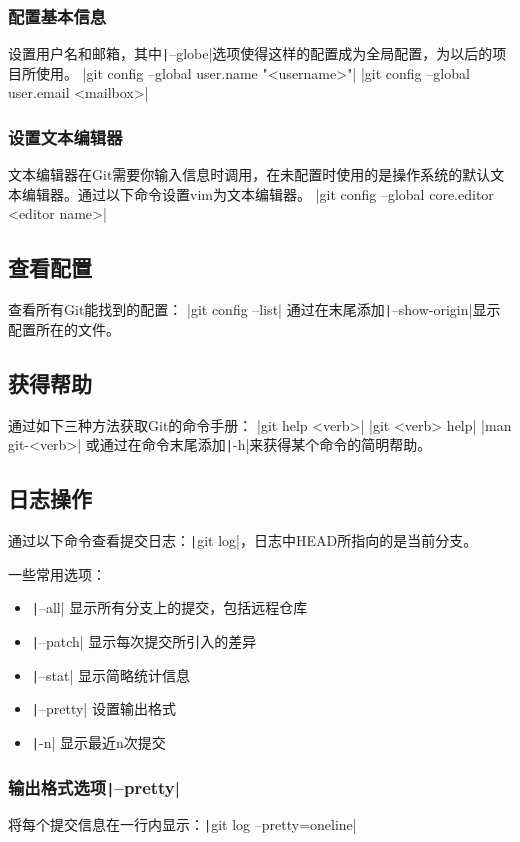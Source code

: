 \documentclass[fontset=ubuntu]{ctexart}
\begin{document}
\subsubsection{配置基本信息}
设置用户名和邮箱，其中\texttt|--globe|选项使得这样的配置成为全局配置，为以后的项目所使用。
|git config --global user.name "<username>"|
|git config --global user.email <mailbox>|

\subsubsection{设置文本编辑器}
文本编辑器在Git需要你输入信息时调用，在未配置时使用的是操作系统的默认文本编辑器。通过以下命令设置vim为文本编辑器。
|git config --global core.editor <editor name>|

\subsection{查看配置}
查看所有Git能找到的配置：
|git config --list|
通过在末尾添加\texttt|--show-origin|显示配置所在的文件。

\subsection{获得帮助}
通过如下三种方法获取Git的命令手册：
|git help <verb>|
|git <verb> help|
|man git-<verb>|
或通过在命令末尾添加\texttt|-h|来获得某个命令的简明帮助。

\subsection{日志操作}
通过以下命令查看提交日志：\texttt|git log|，日志中HEAD所指向的是当前分支。

一些常用选项：
\begin{itemize}
    \item \texttt|--all| 显示所有分支上的提交，包括远程仓库
    \item \texttt|--patch| 显示每次提交所引入的差异
    \item \texttt|--stat| 显示简略统计信息
    \item \texttt|--pretty| 设置输出格式
    \item \texttt|-n| 显示最近n次提交
\end{itemize}

\subsubsection{输出格式选项\texttt|--pretty|}
将每个提交信息在一行内显示：\texttt|git log --pretty=oneline|
\end{document}
